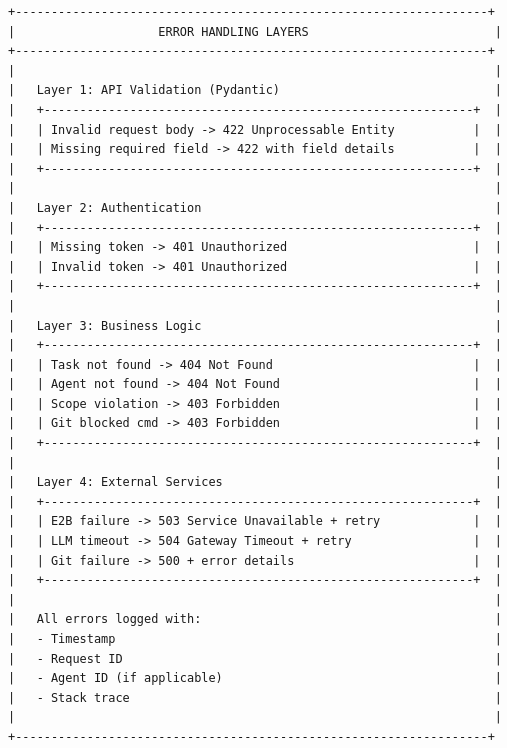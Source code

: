\documentclass[11pt,a4paper]{article}
\begin{document}
\begin{verbatim}
+------------------------------------------------------------------+
|                    ERROR HANDLING LAYERS                          |
+------------------------------------------------------------------+
|                                                                   |
|   Layer 1: API Validation (Pydantic)                              |
|   +------------------------------------------------------------+  |
|   | Invalid request body -> 422 Unprocessable Entity           |  |
|   | Missing required field -> 422 with field details           |  |
|   +------------------------------------------------------------+  |
|                                                                   |
|   Layer 2: Authentication                                         |
|   +------------------------------------------------------------+  |
|   | Missing token -> 401 Unauthorized                          |  |
|   | Invalid token -> 401 Unauthorized                          |  |
|   +------------------------------------------------------------+  |
|                                                                   |
|   Layer 3: Business Logic                                         |
|   +------------------------------------------------------------+  |
|   | Task not found -> 404 Not Found                            |  |
|   | Agent not found -> 404 Not Found                           |  |
|   | Scope violation -> 403 Forbidden                           |  |
|   | Git blocked cmd -> 403 Forbidden                           |  |
|   +------------------------------------------------------------+  |
|                                                                   |
|   Layer 4: External Services                                      |
|   +------------------------------------------------------------+  |
|   | E2B failure -> 503 Service Unavailable + retry             |  |
|   | LLM timeout -> 504 Gateway Timeout + retry                 |  |
|   | Git failure -> 500 + error details                         |  |
|   +------------------------------------------------------------+  |
|                                                                   |
|   All errors logged with:                                         |
|   - Timestamp                                                     |
|   - Request ID                                                    |
|   - Agent ID (if applicable)                                      |
|   - Stack trace                                                   |
|                                                                   |
+------------------------------------------------------------------+
\end{verbatim}
\end{document}
